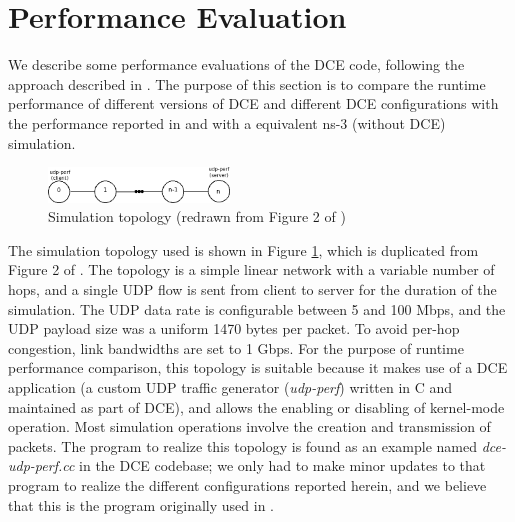 \documentclass{sig-alternate}
\begin{document}

\section{Performance Evaluation}
We describe some performance evaluations of the DCE code, following the
approach described in \cite{Tazaki13}.  The purpose of this section is to
compare the runtime performance of different versions of DCE and different
DCE configurations with the performance reported in \cite{Tazaki13} and with
a equivalent ns-3 (without DCE) simulation.

\begin{figure}[h!]
  \centering
    \includegraphics[width=0.43\textwidth]{figs/topology.png}
  \caption{Simulation topology (redrawn from Figure 2 of \cite{Tazaki13})}
  \label{fig:topology}
\end{figure}

The simulation topology used is shown in Figure \ref{fig:topology}, which
is duplicated from Figure 2 of \cite{Tazaki13}.  The topology is a simple
linear network with a variable number of hops, and a single UDP flow
is sent from client to server for the duration of the simulation.
The UDP data rate is configurable between 5 and 100 Mbps, and the UDP
payload size was a uniform 1470 bytes per packet.
To avoid per-hop congestion, link bandwidths are set to 1 Gbps.
For the purpose of runtime performance comparison, this topology is
suitable because it makes use of a DCE application (a custom UDP traffic
generator (\emph{udp-perf}) written in C and maintained as part of DCE),
and allows the enabling or disabling of kernel-mode operation.  Most
simulation operations involve the creation and transmission of packets.
The program to realize this topology is found as an example named
\emph{dce-udp-perf.cc} in the DCE codebase; we only had to make minor
updates to that program to realize the different configurations reported
herein, and we believe that this is the program originally used
in \cite{Tazaki13}.
\end{document}
